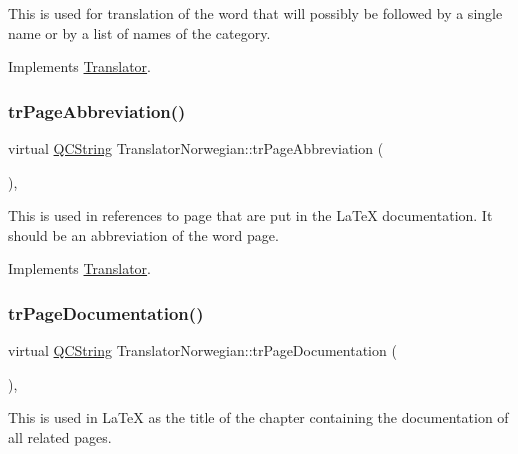 This is used for translation of the word that will possibly be followed by a single name or by a list of names of the category. 

Implements \mbox{\hyperlink{class_translator}{Translator}}.

\mbox{\label{class_translator_norwegian_a4fca097c64f4c71f4b33495cf2e3530c}} 
\subsubsection{\texorpdfstring{trPageAbbreviation()}{trPageAbbreviation()}}
{\footnotesize\ttfamily virtual \mbox{\hyperlink{class_q_c_string}{Q\+C\+String}} Translator\+Norwegian\+::tr\+Page\+Abbreviation (\begin{DoxyParamCaption}{ }\end{DoxyParamCaption})\hspace{0.3cm}{\ttfamily [inline]}, {\ttfamily [virtual]}}

This is used in references to page that are put in the La\+TeX documentation. It should be an abbreviation of the word page. 

Implements \mbox{\hyperlink{class_translator}{Translator}}.

\mbox{\label{class_translator_norwegian_a4bc20393742ef7e9a05a8e63ae3b01a3}} 
\subsubsection{\texorpdfstring{trPageDocumentation()}{trPageDocumentation()}}
{\footnotesize\ttfamily virtual \mbox{\hyperlink{class_q_c_string}{Q\+C\+String}} Translator\+Norwegian\+::tr\+Page\+Documentation (\begin{DoxyParamCaption}{ }\end{DoxyParamCaption})\hspace{0.3cm}{\ttfamily [inline]}, {\ttfamily [virtual]}}

This is used in La\+TeX as the title of the chapter containing the documentation of all related pages. 

